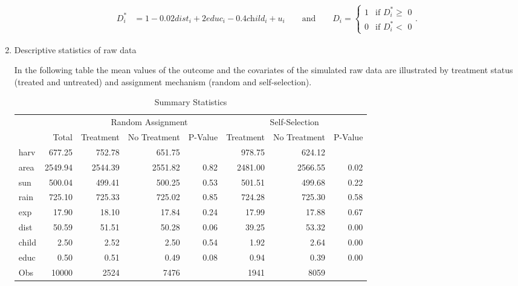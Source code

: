 \begin{enumerate}

\begin{align}
	\label{eq:eq6}
	\textit{D}_i^\ast &= 1 - 0.02 \textit{dist}_i + 2 \textit{educ}_i -  0.4 \textit{child}_i + \textit{u}_i 
	\qquad \text{and}  \qquad  
	\textit{D}_i =
    \begin{cases}
      1 & \text{if $\textit{D}_i^\ast \geq$ 0}\\
      0 & \text{if $\textit{D}_i^\ast <$ 0}
    \end{cases}. 
\end{align}



\item Descriptive statistics of raw data

In the following table the mean values of the outcome and the covariates of the simulated raw data are illustrated by treatment status (treated and untreated) and assignment mechanism (random and self-selection). %


\begin{table}[h!]
\centering
\begin{threeparttable}
\caption{Summary Statistics} \label{tab:data}
\begin{tabular}{lrrrrrrr}
  \hline
  & &\multicolumn{3}{c}{Random Assignment} & \multicolumn{3}{c}{Self-Selection}\\
 & Total & Treatment & No Treatment & P-Value & Treatment & No Treatment & P-Value\\
 \hline
harv & 677.25 & 752.78 & 651.75 &  & 978.75 & 624.12 &  \\ 
  area & 2549.94 & 2544.39 & 2551.82 & 0.82 & 2481.00 & 2566.55 & 0.02 \\ 
  sun & 500.04 & 499.41 & 500.25 & 0.53 & 501.51 & 499.68 & 0.22 \\ 
  rain & 725.10 & 725.33 & 725.02 & 0.85 & 724.28 & 725.30 & 0.58 \\ 
  exp & 17.90 & 18.10 & 17.84 & 0.24 & 17.99 & 17.88 & 0.67 \\ 
  dist & 50.59 & 51.51 & 50.28 & 0.06 & 39.25 & 53.32 & 0.00 \\ 
  child & 2.50 & 2.52 & 2.50 & 0.54 & 1.92 & 2.64 & 0.00 \\ 
  educ & 0.50 & 0.51 & 0.49 & 0.08 & 0.94 & 0.39 & 0.00 \\ 
  Obs & 10000 & 2524 & 7476 &  & 1941 & 8059 &  \\ 
   \hline
\end{tabular}
\end{threeparttable}
\end{table}


\end{enumerate}
